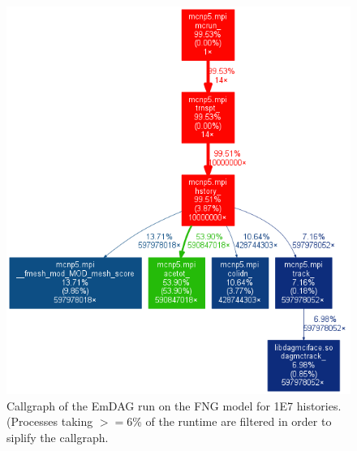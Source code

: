 \documentclass[12pt, a4paper]{article}
\begin{document}
\begin{figure}
  \centering
  \caption{Callgraph of the EmDAG run on the FNG model for 1E7 histories. (Processes taking $>=$6\% of the runtime are filtered in order to siplify the callgraph.}
  \label{emdag-fng-coarse}
  \includegraphics[scale=0.35]{emdag_fng_cg_fine6.png}
  
\end{figure}
\end{document}
